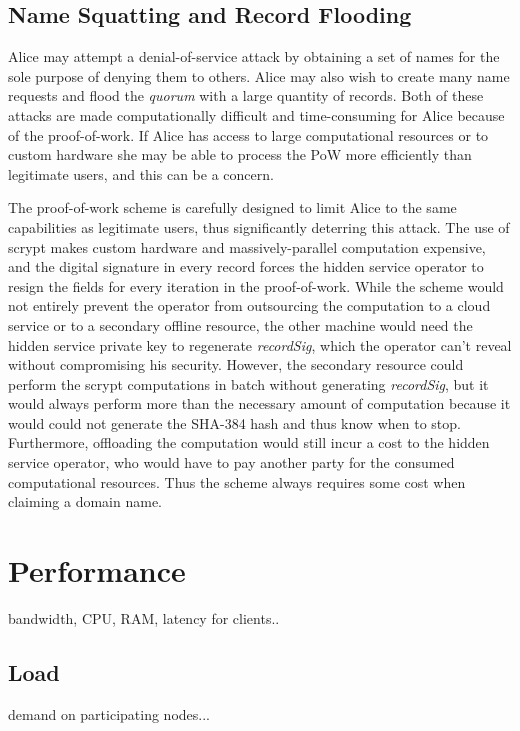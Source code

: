\subsection{Name Squatting and Record Flooding}

Alice may attempt a denial-of-service attack by obtaining a set of names for the sole purpose of denying them to others. Alice may also wish to create many name requests and flood the \emph{quorum} with a large quantity of records. Both of these attacks are made computationally difficult and time-consuming for Alice because of the proof-of-work. If Alice has access to large computational resources or to custom hardware she may be able to process the PoW more efficiently than legitimate users, and this can be a concern.

The proof-of-work scheme is carefully designed to limit Alice to the same capabilities as legitimate users, thus significantly deterring this attack. The use of scrypt makes custom hardware and massively-parallel computation expensive, and the digital signature in every record forces the hidden service operator to resign the fields for every iteration in the proof-of-work. While the scheme would not entirely prevent the operator from outsourcing the computation to a cloud service or to a secondary offline resource, the other machine would need the hidden service private key to regenerate \emph{recordSig}, which the operator can't reveal without compromising his security. However, the secondary resource could perform the scrypt computations in batch without generating \emph{recordSig}, but it would always perform more than the necessary amount of computation because it would could not generate the SHA-384 hash and thus know when to stop. Furthermore, offloading the computation would still incur a cost to the hidden service operator, who would have to pay another party for the consumed computational resources. Thus the scheme always requires some cost when claiming a domain name. 

\section{Performance}

bandwidth, CPU, RAM, latency for clients..

\subsection{Load}

demand on participating nodes...


